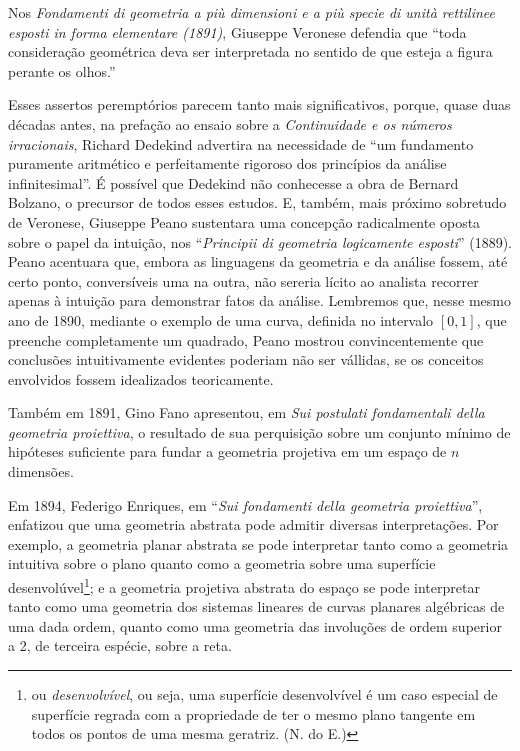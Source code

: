 \documentclass{hipatia}
\begin{document}
Nos \emph{Fondamenti di geometria a più dimensioni e a più specie di unità rettilinee esposti in forma elementare (1891)}, Giuseppe Veronese defendia que ``toda consideração geométrica deva ser interpretada no sentido de que esteja a figura perante os olhos.'' \cite[\emph{apud}, p. 301]{bottazzini2001}  

Esses assertos peremptórios parecem tanto mais significativos, porque, quase duas décadas antes, na prefação ao ensaio sobre a \emph{Continuidade e os números irracionais},  Richard Dedekind advertira na necessidade de ``um fundamento puramente aritmético e perfeitamente rigoroso dos princípios da análise infinitesimal''. É possível que Dedekind não conhecesse a obra de Bernard Bolzano, o precursor de todos esses estudos.  \cite[ prefação, p. III]{dedekind1872}                                                                                                              
E, também, mais próximo sobretudo de Veronese, Giuseppe Peano sustentara uma concepção radicalmente oposta sobre o papel da intuição, nos  ``\emph{Principii di geometria logicamente esposti}'' (1889). Peano acentuara que, embora as linguagens da geometria e da análise fossem, até certo ponto, conversíveis uma na outra, não sereria lícito ao analista recorrer apenas à intuição para demonstrar fatos da análise. Lembremos que, nesse mesmo ano de 1890, mediante o exemplo de uma curva, definida no intervalo $[0, 1]$, que preenche completamente um quadrado, Peano mostrou convincentemente que conclusões intuitivamente evidentes poderiam não ser vállidas, se os conceitos envolvidos fossem idealizados teoricamente.  \cite[p. 143]{kneebone1963}

Também em 1891, Gino Fano apresentou, em \emph{Sui postulati fondamentali della geometria proiettiva}, o resultado de sua perquisição sobre um conjunto mínimo de hipóteses suficiente para fundar a geometria projetiva em um espaço de $n$ dimensões.  \cite[p. 30]{bottazzini2001} 

Em 1894, Federigo Enriques, em ``\emph{Sui fondamenti della geometria proiettiva}'', enfatizou que uma geometria abstrata pode admitir diversas interpretações. Por exemplo, a geometria planar abstrata se pode interpretar tanto como a geometria intuitiva sobre o plano quanto como a geometria sobre uma superfície desenvolúvel\footnote{ou \emph{desenvolvível}, ou seja, uma superfície desenvolvível é um caso especial de superfície regrada com
a propriedade de ter o mesmo plano tangente em todos os pontos de uma mesma geratriz. (N. do E.)}; e a geometria projetiva abstrata do espaço se pode interpretar tanto como uma geometria dos sistemas lineares de curvas planares algébricas de uma dada ordem, quanto como uma geometria das involuções de ordem superior a 2, de terceira espécie, sobre a reta.   \cite[ p. 312]{bottazzini2001} 
\end{document}
